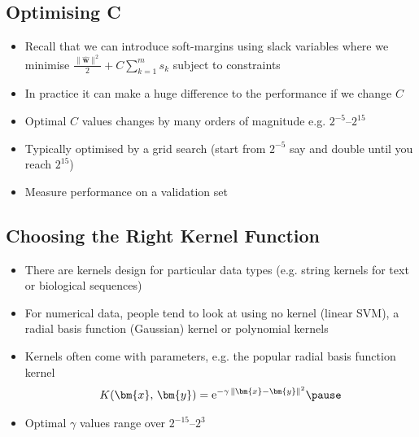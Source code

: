 
\begin{slide}
\section[-2]{Optimising C}

\begin{PauseHighLight}
  \begin{itemize}
  \item Recall that we can introduce soft-margins using slack
    variables where we minimise
    $\frac{\|\hat{\bm{w}}\|^2}{2} + C \sum_{k=1}^m s_k$ subject to
    constraints\pause
  \item In practice it can make a huge difference to the performance if
    we change $C$\pause
  \item Optimal $C$ values changes by many orders of magnitude
    e.g. $2^{-5}$--$2^{15}$\pause
  \item Typically optimised by a grid search (start from $2^{-5}$ say and
    double until you reach $2^{15}$)\pause
  \item Measure performance on a validation set\pause
  \end{itemize}
\end{PauseHighLight}

\end{slide}


\begin{slide}
\section{Choosing the Right Kernel Function}

\begin{PauseHighLight}
  \begin{itemize}
  \item There are kernels design for particular data types (e.g. string
    kernels for text or biological sequences)\pause
  \item For numerical data, people tend to look at using no kernel
    (linear SVM), a radial basis function (Gaussian) kernel or
    polynomial kernels\pause
  \item Kernels often come with parameters, e.g. the popular radial
    basis function kernel
    \begin{align*}
       K(\bm{x},\,\bm{y}) =
      \mathrm{e}^{-\gamma\,\|\bm{x}-\bm{y}\|^2}\pause
    \end{align*}
  \item Optimal $\gamma$ values range over $2^{-15}$--$2^3$\pause
  \end{itemize}
\end{PauseHighLight}

\end{slide}

